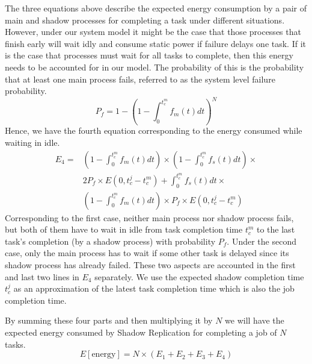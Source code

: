The three equations above describe the expected energy consumption by a
pair of main and shadow processes for completing a task under
different situations. However, under our system model it might be the
case that those processes that finish early will wait idly and
consume static power if failure delays one task. If it is the case
that processes must wait for all tasks to complete, then this energy
needs to be accounted for in our model. The probability of this is the probability that at least one main process fails,
referred to as the system level failure probability.
\begin{equation}
P_f=1-(1-\int_0^{t_c^m}f_m(t)dt)^N
\label{eq:prob_of_one_main_failure}
\end{equation}
Hence, we have the fourth equation corresponding to the energy consumed while waiting in idle. 
\begin{equation}
  \begin{split}
  E_4 = & ( 1-\int_0^{t_c^m}f_m(t)dt) \times (1 - \int_0^{t_c^m} f_s(t)dt) \times \\
        & 2 P_f \times E(0,t_c^j-t_c^m) + \int_0^{t_c^m}f_s(t)dt \times \\
        & (1-\int_0^{t_c^m}f_m(t)dt) \times P_f \times E(0,t_c^j-t_c^m) 
  \end{split}
\end{equation}
Corresponding to the first case, neither main process nor shadow
process fails, but both of them have to wait in idle from task
completion time $t_c^m$ to the last task's completion (by a shadow
process) with probability $P_f$. Under the second case, only the main
process has to wait if some other task is delayed since its shadow
process has already failed. These two aspects are accounted in the
first and last two lines in $E_4$ separately.  We use the expected
shadow completion time $t_c^j$ as an approximation of the latest task
completion time which is also the job completion time.



By summing these four parts and then multiplying it by $N$ we will have
the expected energy consumed by Shadow Replication for completing a
job of $N$ tasks.
\begin{equation}
E[\text{energy}]=N \times (E_1 + E_2 + E_3 + E_4)
\label{eq:total_energy}
\end{equation}

